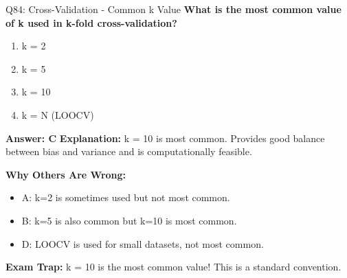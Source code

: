 \documentclass[8pt]{beamer}
\begin{document}
	\begin{frame}{Q84: Cross-Validation - Common k Value}
		\fontsize{6.5}{7.5}\selectfont
		\textbf{What is the most common value of k used in k-fold cross-validation?}
		
		\begin{enumerate}
			\item k = 2
			\item k = 5
			\item k = 10
			\item k = N (LOOCV)
		\end{enumerate}
		
		\vspace{0.05cm}
		\textcolor{myblue}{\textbf{Answer: C}}
		\vspace{0.05cm}
		\textcolor{myblue}{\textbf{Explanation:}} k = 10 is most common. Provides good balance between bias and variance and is computationally feasible.
		
		\vspace{0.05cm}
		\textcolor{myred}{\textbf{Why Others Are Wrong:}}
		\begin{itemize}
			\item \textcolor{myred}{A:} k=2 is sometimes used but not most common.
			\item \textcolor{myred}{B:} k=5 is also common but k=10 is most common.
			\item \textcolor{myred}{D:} LOOCV is used for small datasets, not most common.
		\end{itemize}
		
		\textcolor{myred}{\textbf{Exam Trap:}} k = 10 is the \textcolor{myblue}{most common} value! This is a standard convention.
	\end{frame}
	
\end{document}
